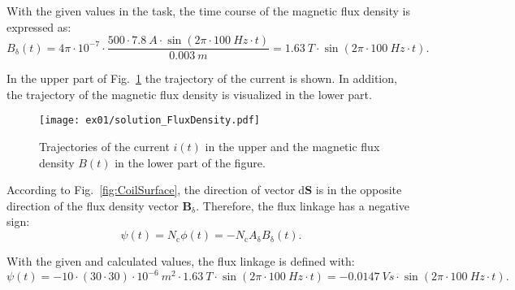 \begin{solutionblock}
    With the given values in the task, the time course of the magnetic flux density is expressed as:
    \begin{equation}
        B_{\mathrm{\updelta}}(t) = 4 \pi \cdot 10^{-7} \cdot \frac{500 \cdot 7.8 \ \si{A} \cdot \sin(2 \pi \cdot 100 \ \si{Hz} \cdot t)}{0.003 \ \si{m}}
        = 1.63 \ \si{T} \cdot \sin(2 \pi \cdot 100 \ \si{Hz} \cdot t).
    \end{equation}

    In the upper part of Fig.~\ref{fig:solution_FluxDensity} the trajectory of the current is shown. In addition, the trajectory of the magnetic flux density is visualized in the lower part.
    \begin{figure}[ht]
        \centering
        \texttt{[image: ex01/solution\_FluxDensity.pdf]}
        \caption{Trajectories of the current $i(t)$ in the upper and the magnetic flux density $B(t)$ in the lower part of the figure.}
        \label{fig:solution_FluxDensity}
    \end{figure}

\end{solutionblock}




\begin{solutionblock}

    According to Fig.~\ref{fig:CoilSurface}, the direction of vector d$\boldsymbol{S}$ is in the opposite direction of the flux density vector $\boldsymbol{{B}}_{\updelta}$. Therefore, the flux linkage has a negative sign:
    \begin{equation}
        \psi(t) = N_{\mathrm{c}} \phi(t)
        = - N_{\mathrm{c}} A_{\mathrm{\updelta}} B_{\mathrm{\updelta}}(t).
    \end{equation}

    With the given and calculated values, the flux linkage is defined with:
    \begin{equation}
        \psi(t) = -10 \cdot (30 \cdot 30) \cdot 10^{-6} \ \si{m^2} \cdot 1.63 \ \si{T} \cdot \sin(2 \pi  \cdot 100 \ \si{Hz} \cdot t)
        = -0.0147 \ \si{Vs} \cdot \sin(2 \pi \cdot 100 \ \si{Hz} \cdot t).
    \end{equation}

\end{solutionblock}


